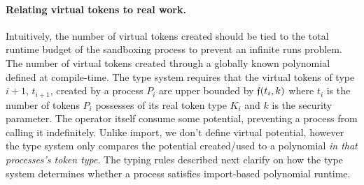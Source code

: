\paragraph{Relating virtual tokens to real work.}
Intuitively, the number of virtual tokens created should be tied to the total runtime budget of the sandboxing process to prevent an infinite runs problem.
The number of virtual tokens created through a globally known polynomial \GlobalF defined at compile-time.
The type system requires that the virtual tokens of type $i+1$, $t_{i+1}$, created by a process $P_i$ are upper bounded by $\mathfrak{f}(t_i, k)$ where $t_i$ is the number of tokens $P_i$ possesses of its real token type $K_i$ and $k$ is the security parameter.
The \inline{$\nwithdraw$} operator itself consume some potential, preventing a process from calling it indefinitely.
Unlike import, we don't define virtual potential, however the type system only compares the potential created/used to a polynomial \emph{in that processes's token type}.
The typing rules described next clarify on how the type system determines whether a process satisfies import-based polynomial runtime.





